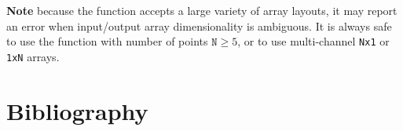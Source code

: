 \textbf{Note} because the function accepts a large variety of array layouts, it may report an error when input/output array dimensionality is ambiguous. It is always safe to use the function with number of points $\texttt{N} \ge 5$, or to use multi-channel \texttt{Nx1} or \texttt{1xN} arrays.


\section{Bibliography}
